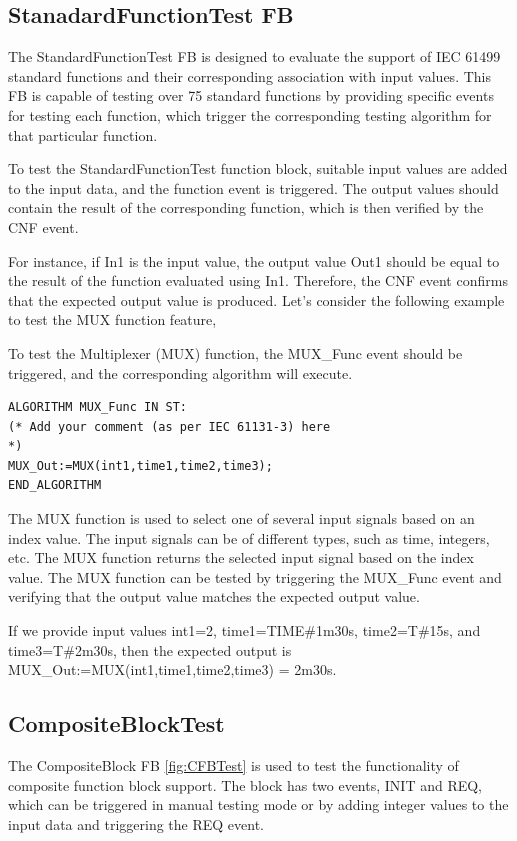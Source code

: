 \begin{bibunit}
\subsection{StanadardFunctionTest FB}

The StandardFunctionTest FB is designed to evaluate the support of IEC 61499 standard functions and their corresponding association with input values. This FB is capable of testing over 75 standard functions by providing specific events for testing each function, which trigger the corresponding testing algorithm for that particular function.

To test the StandardFunctionTest function block, suitable input values are added to the input data, and the function event is triggered. The output values should contain the result of the corresponding function, which is then verified by the CNF event.

For instance, if In1 is the input value, the output value Out1 should be equal to the result of the function evaluated using In1. Therefore, the CNF event confirms that the expected output value is produced. Let's consider the following example to test the MUX function feature,


To test the Multiplexer (MUX) function, the MUX\_Func event should be triggered, and the corresponding algorithm will execute.

\begin{lstlisting} 
ALGORITHM MUX_Func IN ST:
(* Add your comment (as per IEC 61131-3) here
*)
MUX_Out:=MUX(int1,time1,time2,time3);
END_ALGORITHM
\end{lstlisting}




The MUX function is used to select one of several input signals based on an index value. The input signals can be of different types, such as time, integers, etc. The MUX function returns the selected input signal based on the index value. The MUX function can be tested by triggering the MUX\_Func event and verifying that the output value matches the expected output value.

If we provide input values int1=2, time1=TIME\#1m30s, time2=T\#15s, and time3=T\#2m30s, then the expected output is MUX\_Out:=MUX(int1,time1,time2,time3) = 2m30s.


\subsection{CompositeBlockTest}

The CompositeBlock FB \ref{fig:CFBTest} is used to test the functionality of composite function block support. The block has two events, INIT and REQ, which can be triggered in manual testing mode or by adding integer values to the input data and triggering the REQ event.


\end{bibunit}

